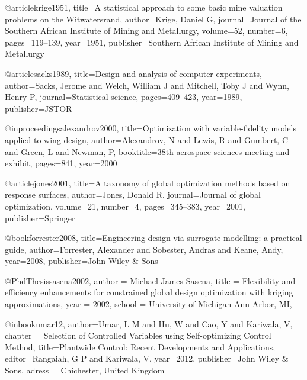 @article{krige1951,
  title={A statistical approach to some basic mine valuation problems on the Witwatersrand},
  author={Krige, Daniel G},
  journal={Journal of the Southern African Institute of Mining and Metallurgy},
  volume={52},
  number={6},
  pages={119--139},
  year={1951},
  publisher={Southern African Institute of Mining and Metallurgy}
}

@article{sacks1989,
  title={Design and analysis of computer experiments},
  author={Sacks, Jerome and Welch, William J and Mitchell, Toby J and Wynn, Henry P},
  journal={Statistical science},
  pages={409--423},
  year={1989},
  publisher={JSTOR}
}

@inproceedings{alexandrov2000,
  title={Optimization with variable-fidelity models applied to wing design},
  author={Alexandrov, N and Lewis, R and Gumbert, C and Green, L and Newman, P},
  booktitle={38th aerospace sciences meeting and exhibit},
  pages={841},
  year={2000}
}

@article{jones2001,
  title={A taxonomy of global optimization methods based on response surfaces},
  author={Jones, Donald R},
  journal={Journal of global optimization},
  volume={21},
  number={4},
  pages={345--383},
  year={2001},
  publisher={Springer}
}

@book{forrester2008,
title={Engineering design via surrogate modelling: a practical guide},
author={Forrester, Alexander and Sobester, Andras and Keane, Andy},
year={2008},
publisher={John Wiley & Sons}
}

@PhdThesis{sasena2002,
author = {Michael James Sasena},
title  = {Flexibility and efficiency enhancements for constrained global design optimization with kriging approximations},
year   = {2002},
school = {University of Michigan Ann Arbor, MI},
}

@inbook{umar12,
  author={Umar, L M and Hu, W and Cao, Y and Kariwala, V},
  chapter = {Selection of Controlled Variables using Self-optimizing Control Method},
  title={Plantwide Control: Recent Developments and Applications},
  editor={Rangaiah, G P and Kariwala, V},
  year={2012},
  publisher={John Wiley \& Sons},
  adress = {Chichester, United Kingdom}
}


